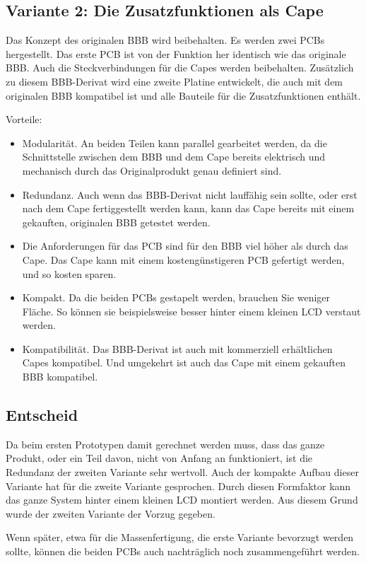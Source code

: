 \subsection{Variante 2: Die Zusatzfunktionen als Cape}
Das Konzept des originalen BBB wird beibehalten. Es werden zwei PCBs hergestellt. Das erste PCB ist von der Funktion her identisch wie das originale BBB. Auch die Steckverbindungen für die Capes werden beibehalten. Zusätzlich zu diesem BBB-Derivat wird eine zweite Platine entwickelt, die auch mit dem originalen BBB kompatibel ist und alle Bauteile für die Zusatzfunktionen enthält.

Vorteile:
\begin{itemize}
\item Modularität. An beiden Teilen kann parallel gearbeitet werden, da die Schnittstelle zwischen dem BBB und dem Cape bereits elektrisch und mechanisch durch das Originalprodukt genau definiert sind. 
\item Redundanz. Auch wenn das BBB-Derivat nicht lauffähig sein sollte, oder erst nach dem Cape fertiggestellt werden kann, kann das Cape bereits mit einem gekauften, originalen BBB getestet werden.
\item Die Anforderungen für das PCB sind für den BBB viel höher als durch das Cape. Das Cape kann mit einem kostengünstigeren PCB gefertigt werden, und so kosten sparen.
\item Kompakt. Da die beiden PCBs gestapelt werden, brauchen Sie weniger Fläche. So können sie beispielsweise besser hinter einem kleinen LCD verstaut werden.
\item Kompatibilität. Das BBB-Derivat ist auch mit kommerziell erhältlichen Capes kompatibel. Und umgekehrt ist auch das Cape mit einem gekauften BBB kompatibel.
\end{itemize}

\subsection{Entscheid}
Da beim ersten Prototypen damit gerechnet werden muss, dass das ganze Produkt, oder ein Teil davon, nicht von Anfang an funktioniert, ist die Redundanz der zweiten Variante sehr wertvoll. Auch der kompakte Aufbau dieser Variante hat für die zweite Variante gesprochen. Durch diesen Formfaktor kann das ganze System hinter einem kleinen LCD montiert werden. Aus diesem Grund wurde der zweiten Variante der Vorzug gegeben.

Wenn später, etwa für die Massenfertigung, die erste Variante bevorzugt werden sollte, können die beiden PCBs auch nachträglich noch zusammengeführt werden.



